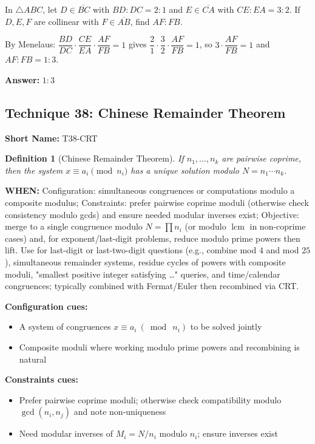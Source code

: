 \documentclass[12pt]{article}
\newtheorem{definition}{Definition}[section]
\newenvironment{problem}[1]
{\begin{tcolorbox}[colback=blue!5!white,colframe=blue!75!black,title={#1}]}{\end{tcolorbox}}
\newenvironment{solution}
{\begin{tcolorbox}[colback=green!5!white,colframe=green!75!black,title={Solution}]}{\end{tcolorbox}}
\begin{document}
\begin{problem}{Example: Find a Ratio on the Transversal}
In $\triangle ABC$, let $D \in \overline{BC}$ with $BD:DC = 2:1$ and $E \in \overline{CA}$ with $CE:EA = 3:2$. If $D, E, F$ are collinear with $F \in \overline{AB}$, find $AF:FB$.
\end{problem}

\begin{solution}
By Menelaus: $\dfrac{BD}{DC}\cdot\dfrac{CE}{EA}\cdot\dfrac{AF}{FB} = 1$ gives $\dfrac{2}{1}\cdot\dfrac{3}{2}\cdot\dfrac{AF}{FB} = 1$, so $3\cdot\dfrac{AF}{FB} = 1$ and $AF:FB = 1:3$.

\textbf{Answer:} $1:3$
\end{solution}

\subsection{Technique 38: Chinese Remainder Theorem}
\textbf{Short Name:} T38-CRT

\begin{definition}[Chinese Remainder Theorem]
If $n_1, \ldots, n_k$ are pairwise coprime, then the system $x \equiv a_i \pmod{n_i}$ has a unique solution modulo $N = n_1\cdots n_k$.
\end{definition}

\textbf{WHEN:} Configuration: simultaneous congruences or computations modulo a composite modulus; Constraints: prefer pairwise coprime moduli (otherwise check consistency modulo gcds) and ensure needed modular inverses exist; Objective: merge to a single congruence modulo $N=\prod n_i$ (or modulo $\operatorname{lcm}$ in non-coprime cases) and, for exponent/last-digit problems, reduce modulo prime powers then lift. Use for last-digit or last-two-digit questions (e.g., combine mod $4$ and mod $25$), simultaneous remainder systems, residue cycles of powers with composite moduli, "smallest positive integer satisfying …" queries, and time/calendar congruences; typically combined with Fermat/Euler then recombined via CRT.

\textbf{Configuration cues:}
\begin{itemize}
    \item A system of congruences $x\equiv a_i\ (\bmod\ n_i)$ to be solved jointly
    \item Composite moduli where working modulo prime powers and recombining is natural
\end{itemize}

\textbf{Constraints cues:}
\begin{itemize}
    \item Prefer pairwise coprime moduli; otherwise check compatibility modulo $\gcd(n_i,n_j)$ and note non-uniqueness
    \item Need modular inverses of $M_i=N/n_i$ modulo $n_i$; ensure inverses exist
\end{itemize}
\end{document}
